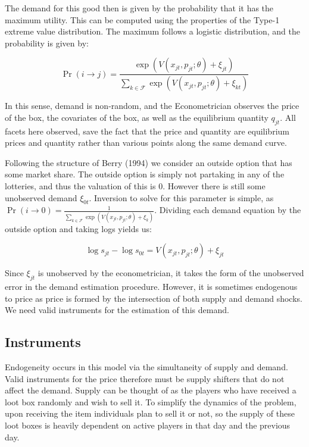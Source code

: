 \documentclass[12pt]{paper}
\begin{document}
The demand for this good then is given by the probability that it has
the maximum utility. This can be computed using the properties of the
Type-1 extreme value distribution. The maximum follows a logistic
distribution, and the probability is given by:

\begin{equation*}
  \Pr( i \rightarrow j ) = \frac{\exp( V(x_{jt},p_{jt} ; \theta) + \xi_{jt})}{ \sum_{k \in \mathcal{F}}
    \exp(V(x_{jt},p_{jt}; \theta) + \xi_{kt})}
\end{equation*}

In this sense, demand is non-random, and the Econometrician observes
the price of the box, the covariates of the box, as well as the
equilibrium quantity $q_{jt}$. All facets here observed, save the fact
that the price and quantity are equilibrium prices and quantity rather
than various points along the same demand curve.

Following the structure of Berry (1994) we consider an outside option
that has some market share. The outside option is simply not partaking
in any of the lotteries, and thus the valuation of this is $0$.
However there is still some unobserved demand $\xi_{0t}$. Inversion to
solve for this parameter is simple, as
$\Pr( i \rightarrow 0) = \frac{1}{ \sum_{k \in \mathcal{F}} \exp(V(x_{jt},p_{jt}; \theta) +
  \xi_k)}$.  Dividing each demand equation by the outside option and
taking logs yields us:

\begin{equation*}
  \log s_{jt} - \log s_{0t} = V(x_{jt}, p_{jt}; \theta) + \xi_{jt}
\end{equation*}

Since $\xi_{jt}$ is unobserved by the econometrician, it takes the form
of the unobserved error in the demand estimation procedure. However,
it is sometimes endogenous to price as price is formed by the
intersection of both supply and demand shocks. We need valid
instruments for the estimation of this demand.

\subsection{Instruments}

Endogeneity occurs in this model via the simultaneity of supply and
demand. Valid instruments for the price therefore must be supply
shifters that do not affect the demand. Supply can be thought of as
the players who have received a loot box randomly and wish to sell
it. To simplify the dynamics of the problem, upon receiving the item
individuals plan to sell it or not, so the supply of these loot boxes
is heavily dependent on active players in that day and the previous
day. 
\end{document}
